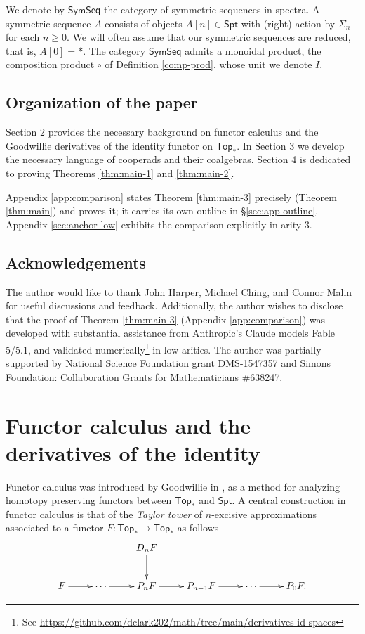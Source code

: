 \documentclass[12pt]{amsart}
\theoremstyle{definition}
\theoremstyle{remark}
\newcommand{\Top}{\mathsf{Top}_*}
\newcommand{\Spt}{\mathsf{Spt}}
\newcommand{\SymSeq}{\mathsf{SymSeq}}
\newcommand{\pt}{*}
\begin{document}
We denote by $\SymSeq$ the category of symmetric sequences in spectra. A symmetric sequence $A$ consists of objects $A[n] \in \Spt$ with (right) action by $\Sigma_n$ for each $n\geq 0$. We will often assume that our symmetric sequences are reduced, that is, $A[0]=\pt$. The category $\SymSeq$ admits a monoidal product, the composition product $\circ$ of Definition \ref{comp-prod}, whose unit we denote $I$.

\subsection{Organization of the paper}
Section 2 provides the necessary background on functor calculus and the Goodwillie derivatives of the identity functor on $\Top$. In Section 3 we develop the necessary language of cooperads and their coalgebras. Section 4 is dedicated to proving Theorems \ref{thm:main-1} and \ref{thm:main-2}.

Appendix \ref{app:comparison} states Theorem \ref{thm:main-3} precisely (Theorem \ref{thm:main}) and proves it; it carries its own outline in \S\ref{sec:app-outline}. Appendix \ref{sec:anchor-low} exhibits the comparison explicitly in arity 3.

\subsection{Acknowledgements} \label{sec:ack}
The author would like to thank John Harper, Michael Ching, and Connor Malin for useful discussions and feedback. Additionally, the author wishes to disclose that the proof of Theorem \ref{thm:main-3} (Appendix \ref{app:comparison}) was developed with substantial assistance from Anthropic's Claude models Fable 5/5.1, and validated numerically\footnote{See \url{https://github.com/dclark202/math/tree/main/derivatives-id-spaces}} in low arities. The author was partially supported by National Science Foundation grant DMS-1547357 and Simons Foundation: Collaboration Grants for Mathematicians \#638247. 





\section{Functor calculus and the derivatives of the identity}

Functor calculus was introduced by Goodwillie in \cite{Goo-Calc2}, \cite{Goo-Calc3} as a method for analyzing homotopy preserving functors between $\Top$ and $\Spt$. A central construction in functor calculus is that of the \textit{Taylor tower} of $n$-excisive approximations associated to a functor $F\colon \Top \to \Top$ as follows
\begin{equation}\label{Taylor-tower}
    \xymatrix{
    & & D_nF\ar[d] & &&\\
    F\ar[r] & \cdots \ar[r] & P_nF \ar[r] & P_{n-1}F \ar[r] & \cdots \ar[r] & P_0F.}
\end{equation}
\end{document}

